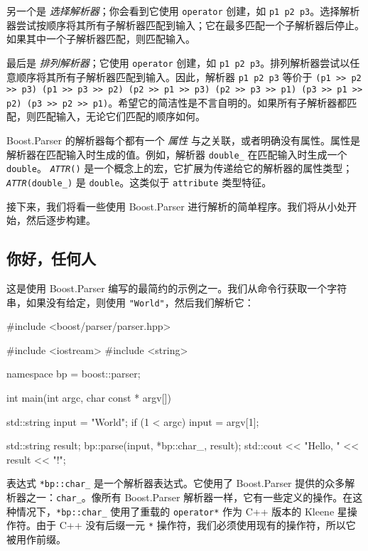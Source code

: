 另一个是 \emph{选择解析器}；你会看到它使用 \texttt{operator\textbar{}} 创建，如 \texttt{p1 \textbar{} p2 \textbar{} p3}。选择解析器尝试按顺序将其所有子解析器匹配到输入；它在最多匹配一个子解析器后停止。如果其中一个子解析器匹配，则匹配输入。

最后是 \emph{排列解析器}；它使用 \texttt{operator\textbar{}\textbar{}} 创建，如 \texttt{p1 \textbar{}\textbar{} p2 \textbar{}\textbar{} p3}。排列解析器尝试以任意顺序将其所有子解析器匹配到输入。因此，解析器 \texttt{p1 \textbar{}\textbar{} p2 \textbar{}\textbar{} p3} 等价于 \texttt{(p1 >> p2 >> p3) \textbar{} (p1 >> p3 >> p2) \textbar{} (p2 >> p1 >> p3) \textbar{} (p2 >> p3 >> p1) \textbar{} (p3 >> p1 >> p2) \textbar{} (p3 >> p2 >> p1)}。希望它的简洁性是不言自明的。如果所有子解析器都匹配，则匹配输入，无论它们匹配的顺序如何。

Boost.Parser 的解析器每个都有一个 \emph{属性} 与之关联，或者明确没有属性。属性是解析器在匹配输入时生成的值。例如，解析器 \texttt{double\_} 在匹配输入时生成一个 \texttt{double}。 \emph{\texttt{ATTR}}\texttt{()} 是一个概念上的宏，它扩展为传递给它的解析器的属性类型；\emph{\texttt{ATTR}}\texttt{(double\_)} 是 \texttt{double}。这类似于 \texttt{attribute} 类型特征。

接下来，我们将看一些使用 Boost.Parser 进行解析的简单程序。我们将从小处开始，然后逐步构建。

\subsection{你好，任何人}

这是使用 Boost.Parser 编写的最简约的示例之一。我们从命令行获取一个字符串，如果没有给定，则使用 \texttt{"World"}，然后我们解析它：

\begin{code}
#include <boost/parser/parser.hpp>

#include <iostream>
#include <string>


namespace bp = boost::parser;

int main(int argc, char const * argv[])
{
    std::string input = "World";
    if (1 < argc)
        input = argv[1];

    std::string result;
    bp::parse(input, *bp::char_, result);
    std::cout << "Hello, " << result << "!\n";
}
\end{code}

表达式 \texttt{*bp::char\_} 是一个解析器表达式。它使用了 Boost.Parser 提供的众多解析器之一：\texttt{char\_}。像所有 Boost.Parser 解析器一样，它有一些定义的操作。在这种情况下，\texttt{*bp::char\_} 使用了重载的 \texttt{operator*} 作为 C++ 版本的 Kleene 星操作符。由于 C++ 没有后缀一元 \texttt{*} 操作符，我们必须使用现有的操作符，所以它被用作前缀。

